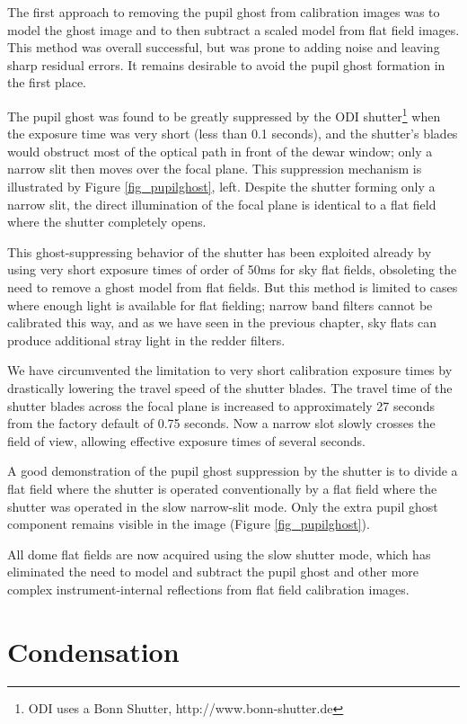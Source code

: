 \documentclass[]{spieman}
\begin{document}
The first approach to removing the pupil ghost from calibration images was to
model the ghost image and to then subtract a scaled model from flat field
images. This method was overall successful, but was prone to adding noise and
leaving sharp residual errors. It remains desirable to avoid the pupil ghost
formation in the first place.

The pupil ghost was found to be greatly suppressed by the ODI
shutter\footnote{ODI uses a Bonn Shutter, http://www.bonn-shutter.de} when the
exposure time was very short (less than 0.1 seconds), and the shutter's blades
would obstruct most of the optical path in front of the dewar window; only a narrow
slit then moves  over the focal plane. This suppression mechanism is illustrated
by Figure \ref{fig_pupilghost}, left. Despite the shutter forming
only a narrow slit, the direct illumination of the focal plane is identical to a
flat field where the shutter completely opens.

This ghost-suppressing behavior of the shutter has been exploited already by
using very short exposure times of order of 50ms for sky flat fields, obsoleting
the need to remove a ghost model from flat fields. But this method is limited to
cases where enough light is available for flat fielding; narrow band filters
cannot be calibrated this way, and as we have seen in the previous chapter, sky
flats can produce additional stray light in the redder filters.

We have circumvented the limitation to very short calibration exposure times by
drastically lowering the travel speed of the shutter blades. The travel time of
the shutter blades across the focal plane is increased to approximately  27
seconds from the factory default of 0.75 seconds.  Now a narrow slot slowly
crosses the field of view, allowing effective exposure times of several seconds.

A good demonstration of the pupil ghost suppression by the shutter is to divide
a flat field where the shutter is operated conventionally by a flat field where
the shutter was operated in the slow narrow-slit mode. Only the extra pupil ghost
component remains visible in the image (Figure \ref{fig_pupilghost}).

All dome flat fields are now acquired using the slow shutter mode, which has eliminated
the need to model and subtract the pupil ghost and other more complex instrument-internal
reflections from flat field calibration images.  

\section{Condensation}
\end{document}
